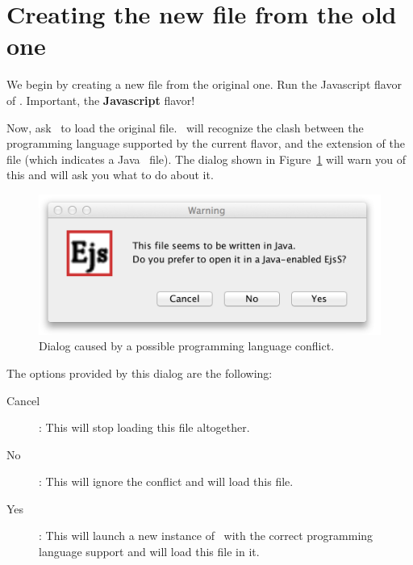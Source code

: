    \section{Creating the new file from the old one}\label{section:04Creating}

We begin by creating a new  file from the original  one. Run the Javascript flavor of \ejs. Important, the \textbf{Javascript} flavor! 

Now, ask \ejs\ to load the original  file. \ejs\ will recognize the clash between the programming language supported by the current flavor, and the  extension of the file (which indicates a Java \ejs\ file). The dialog shown in Figure~\ref{fig:04JavatoJS/FlavorDetection} will warn you of this and will ask you what to do about it. 

\begin{figure}[htb]
  \centering
  \includegraphics[scale=\scale]{04JavatoJS/images/FlavorDetection.png}
  \caption{Dialog caused by a possible programming language conflict.}
  \label{fig:04JavatoJS/FlavorDetection}
\end{figure}

\noindent The options provided by this dialog are the following:
\begin{description}
  \item[Cancel]: This will stop loading this file altogether.
  \item[No]: This will ignore the conflict and will load this file.
  \item[Yes]: This will launch a new instance of \ejs\ with the correct programming language support and will load this file in it.
\end{description}

